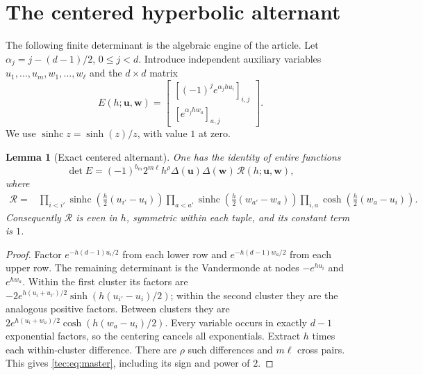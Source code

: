 \documentclass[11pt,a4paper]{article}
\numberwithin{equation}{section}
\newtheorem{lemma}[theorem]{Lemma}
\theoremstyle{definition}
\theoremstyle{remark}
\newcommand{\Del}{\Delta}
\newcommand{\bu}{\boldsymbol u}
\newcommand{\bw}{\boldsymbol w}
\newcommand{\sinhc}{\operatorname{sinhc}}
\begin{document}
\section{The centered hyperbolic alternant}\label{tec:sec:alternant}
The following finite determinant is the algebraic engine of the article.
Let $\alpha_j=j-(d-1)/2$, $0\le j<d$. Introduce independent auxiliary
variables $u_1,\ldots,u_m,w_1,\ldots,w_\ell$ and the $d\times d$ matrix
\begin{equation}\label{tec:eq:expMat}
 E(h;\bu,\bw)=
 \begin{bmatrix}
 [(-1)^j e^{\alpha_jhu_i}]_{i,j}\\
 [e^{\alpha_jhw_a}]_{a,j}
 \end{bmatrix}.
\end{equation}
We use $\sinhc z=\sinh(z)/z$, with value $1$ at zero.

\begin{lemma}[Exact centered alternant]\label{tec:lem:alternant}
One has the identity of entire functions
\begin{equation}\label{tec:eq:master}
 \det E=(-1)^{b_m}2^{m\ell}h^\rho
            \Del(\bu)\Del(\bw)\,\mathcal R(h;\bu,\bw),
\end{equation}
where
\begin{align}\label{tec:eq:Rgenerator}
 \mathcal R={}&
 \prod_{i<i'}\sinhc\!\left(\frac h2(u_{i'}-u_i)\right)
 \prod_{a<a'}\sinhc\!\left(\frac h2(w_{a'}-w_a)\right)
 \prod_{i,a}\cosh\!\left(\frac h2(w_a-u_i)\right).
\end{align}
Consequently $\mathcal R$ is even in $h$, symmetric within each tuple,
and its constant term is $1$.
\end{lemma}
\begin{proof}
Factor $e^{-h(d-1)u_i/2}$ from each lower row and
$e^{-h(d-1)w_a/2}$ from each upper row. The remaining determinant is
the Vandermonde at nodes $-e^{hu_i}$ and $e^{hw_a}$. Within the first
cluster its factors are
$-2e^{h(u_i+u_{i'})/2}\sinh(h(u_{i'}-u_i)/2)$; within the second
cluster they are the analogous positive factors. Between clusters they
are $2e^{h(u_i+w_a)/2}\cosh(h(w_a-u_i)/2)$.
Every variable occurs in exactly $d-1$ exponential factors, so the
centering cancels all exponentials. Extract $h$ times each within-cluster
difference. There are $\rho$ such differences and $m\ell$ cross pairs.
This gives \eqref{tec:eq:master}, including its sign and power of $2$.
\end{proof}
\end{document}
